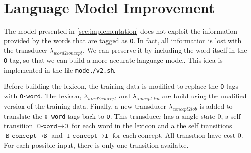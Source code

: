 \section{Language Model Improvement}
\label{sec:improvements}

The model presented in \cref{sec:implementation} does not exploit the information provided by the words that are tagged as \texttt{O}.
In fact, all information is lost with the transducer $\lambda_{word2concept}$.
We can preserve it by including the word itself in the \texttt{O} tag, so that we can build a more accurate language model.
This idea is implemented in the file \texttt{model/v2.sh}.

Before building the lexicon, the training data is modified to replace the \texttt{O} tags with \texttt{O-word}.
The lexicon, $\lambda_{word2concept}$ and $\lambda_{concept\_lm}$ are build using the modified version of the training data.
Finally, a new transducer $\lambda_{concept2iob}$ is added to translate the \texttt{O-word} tags back to \texttt{O}.
This transducer has a single state $0$, a self transition $\texttt{O-word} \rightarrow \texttt{O}$ for each word in the lexicon and a the self transitions $\texttt{B-concept} \rightarrow \texttt{B}$ and $\texttt{I-concept} \rightarrow \texttt{I}$ for each concept.
All transition have cost $0$.
For each possible input, there is only one transition available.
